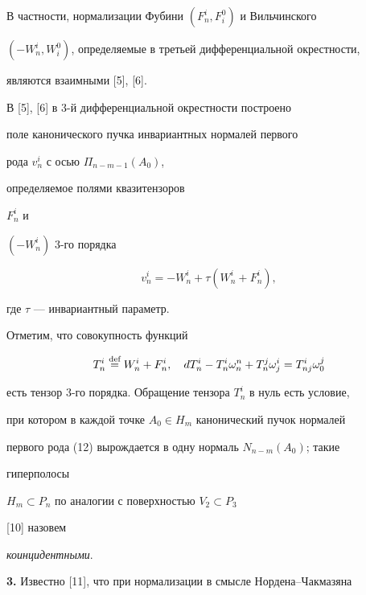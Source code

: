В частности, нормализации Фубини $(F^i_n,F^0_i)$ и Вильчинского 


$(-W^i_n,W^0_i)$, определяемые в третьей дифференциальной окрестности,  


являются взаимными [5], [6]. 


 


В [5], [6] в 3-й дифференциальной окрестности построено 


поле канонического пучка инвариантных нормалей первого 


рода $v^i_n$ с осью $\Pi_{n-m-1}(A_0)$, 


определяемое полями квазитензоров 


$F^i_n$ и  


$(-W^i_n)$ 3-го порядка 


\begin{equation} 


v^i_n=-W^i_n+\tau(W^i_n+F^i_n), 


\end{equation} 


где $\tau$ --- инвариантный параметр. 


 


Отметим, что совокупность функций 


\begin{equation} 


T^i_n\up{\text{def}}{=}W^i_n+F^i_n,\quad 


d T^i_n-T^i_n\omega^n_n+T^j_n\omega^i_j=T^i_{n j}\omega^j_0 


\end{equation} 


есть тензор 3-го порядка. Обращение тензора $T^i_n$ в нуль есть условие,  


при котором в каждой точке $A_0\in H_m$ канонический пучок нормалей 


первого рода (12) вырождается в одну нормаль $N_{n-m}(A_0)$; такие 


гиперполосы 


$H_m\subset P_n$ по аналогии с поверхностью $V_2\subset P_3$ 


[10] назовем 


{\it коинцидентными}. 


\medskip 


 


{\bf 3.} Известно [11], что при нормализации в смысле Нордена--Чакмазяна 


